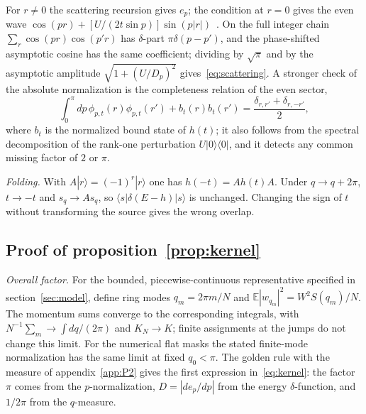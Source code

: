 \documentclass[12pt,a4paper]{article}
\theoremstyle{remark}
\newcommand{\E}{\mathbb{E}}
\begin{document}
For $r\neq0$ the scattering recursion gives $e_p$; the condition at $r=0$ gives the even wave $\cos(pr)+[U/(2t\sin p)]\sin(p|r|)$~\cite{ValientePetrosyan2008}. On the full integer chain $\sum_r\cos(pr)\cos(p'r)$ has $\delta$-part $\pi\delta(p-p')$, and the phase-shifted asymptotic cosine has the same coefficient; dividing by $\sqrt\pi$ and by the asymptotic amplitude $\sqrt{1+(U/D_p)^2}$ gives~\eqref{eq:scattering}. A stronger check of the absolute normalization is the completeness relation of the even sector,
\begin{equation}\label{eq:completeness}
\int_0^\pi dp\,\phi_{p,t}(r)\phi_{p,t}(r')+b_t(r)b_t(r')=\frac{\delta_{r,r'}+\delta_{r,-r'}}{2},
\end{equation}
where $b_t$ is the normalized bound state of $h(t)$; it also follows from the spectral decomposition of the rank-one perturbation $U|0\rangle\langle0|$, and it detects any common missing factor of $2$ or $\pi$.

\emph{Folding.} With $A|r\rangle=(-1)^r|r\rangle$ one has $h(-t)=Ah(t)A$. Under $q\to q+2\pi$, $t\to-t$ and $s_q\to As_q$, so $\langle s|\delta(E-h)|s\rangle$ is unchanged. Changing the sign of $t$ without transforming the source gives the wrong overlap.

\subsection{Proof of proposition~\ref{prop:kernel}}\label{app:P3}

\emph{Overall factor.} For the bounded, piecewise-continuous representative specified in section~\ref{sec:model}, define ring modes $q_m=2\pi m/N$ and $\E|w_{q_m}|^2=W^2S(q_m)/N$. The momentum sums converge to the corresponding integrals, with $N^{-1}\sum_m\to\int dq/(2\pi)$ and $K_N\to K$; finite assignments at the jumps do not change this limit. For the numerical flat masks the stated finite-mode normalization has the same limit at fixed $q_0<\pi$. The golden rule with the measure of appendix~\ref{app:P2} gives the first expression in~\eqref{eq:kernel}: the factor $\pi$ comes from the $p$-normalization, $D=|de_p/dp|$ from the energy $\delta$-function, and $1/2\pi$ from the $q$-measure.
\end{document}

